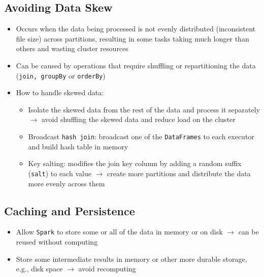 \documentclass[11pt]{scrartcl}
\begin{document}
\subsection{Avoiding Data Skew}
\begin{itemize}
	\item Occurs when the data being processed is not evenly distributed (inconsistent file size) across partitions, resulting in some tasks taking much longer than others and wasting cluster resources
	\item Can be caused by operations that require shuffling or repartitioning the data (\texttt{join, groupBy} or \texttt{orderBy})
	\item How to handle skewed data:
	\begin{itemize}
		\item Isolate the skewed data from the rest of the data and process it separately $\to$ avoid shuffling the skewed data and reduce load on the cluster
		\item Broadcast \texttt{hash join}: broadcast one of the \texttt{DataFrames} to each executor and build hash table in memory
		\item Key salting: modifies the join key column by adding a random suffix (\texttt{salt}) to each value $\to$ create more partitions and distribute the data more evenly across them
	\end{itemize}
\end{itemize}

\subsection{Caching and Persistence}
\begin{itemize}
	\item Allow \texttt{Spark} to store some or all of the data in memory or on disk $\to$ can be reused without computing
	\item Store some intermediate results in memory or other more durable storage, e.g., disk space $\to$ avoid recomputing
\end{itemize}
\end{document}
